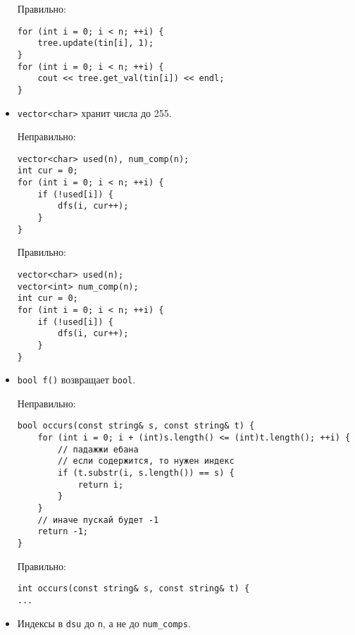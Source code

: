 \begin{itemize}
Правильно:

\begin{verbatim}
for (int i = 0; i < n; ++i) {
    tree.update(tin[i], 1);
}
for (int i = 0; i < n; ++i) {
    cout << tree.get_val(tin[i]) << endl;
}
\end{verbatim}

\item \texttt{vector<char>} хранит числа до 255.

Неправильно:

\begin{verbatim}
vector<char> used(n), num_comp(n);
int cur = 0;
for (int i = 0; i < n; ++i) {
    if (!used[i]) {
        dfs(i, cur++);
    }
}
\end{verbatim}

Правильно:

\begin{verbatim}
vector<char> used(n);
vector<int> num_comp(n);
int cur = 0;
for (int i = 0; i < n; ++i) {
    if (!used[i]) {
        dfs(i, cur++);
    }
}
\end{verbatim}

\item \texttt{bool f()} возвращает \texttt{bool}.

Неправильно:

\begin{verbatim}
bool occurs(const string& s, const string& t) {
    for (int i = 0; i + (int)s.length() <= (int)t.length(); ++i) {
        // падажжи ебана
        // если содержится, то нужен индекс
        if (t.substr(i, s.length()) == s) {
            return i;
        }
    }
    // иначе пускай будет -1
    return -1;
}
\end{verbatim}

Правильно:

\begin{verbatim}
int occurs(const string& s, const string& t) {
...
\end{verbatim}

\item Индексы в \texttt{dsu} до \texttt{n}, а не до \texttt{num\_comps}.


\end{itemize}
